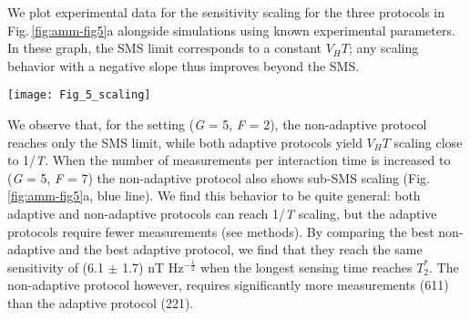 We plot experimental data for the sensitivity scaling for the three protocols in Fig.\,\ref{fig:amm-fig5}a alongside simulations using known experimental parameters. In these graph, the SMS limit corresponds to a constant $V_H T$; any scaling behavior with a negative slope thus improves beyond the SMS.

\begin{figure*}
	\centering
	\texttt{[image: Fig\_5\_scaling]}
	\caption{\label{fig:amm-fig5} \textbf{Scaling of sensitivity as a function of total time.} (a) The three protocols are compared by plotting $\eta^2 - V_H T$  as a function of the total sensing time \textit{T} (not including spin initialization and readout). For (\textit{G} = 5, \textit{F} = 2) the non-adaptive protocol (green triangles) is bound to the SMS limit, while for both the limited-adaptive (orange circles) and the optimized adaptive (red triangles) protocols $\eta^2$ scales close to 1/\textit{T}. The sensitivity of the limited-adaptive protocol is, however, worse than the optimized-adaptive one. When increasing the number of Ramsey experiments per sensing time to (\textit{G} = 5, \textit{F} = 7), the non-adaptive protocol (blue triangles) reaches Heisenberg-like scaling, with a sensitivity comparable to the optimized adaptive protocol for (\textit{G}=5, \textit{F}=2). (b) By including spin initialization and readout durations, the superiority of the optimized adaptive protocol (red triangles), which requires less Ramsey runs per sensing time (smaller \textit{F}, \textit{G}) to reach 1/\textit{T} scaling, is evidenced. The optimized adaptive protocol can estimate magnetic fields with a repetition rate of 20 Hz, with a sensitivity more than one order of magnitude better than the non-adaptive protocol. All data are taken with 700 repetitions per data-point. In both plots, error bars corresponding to one standard deviation of the results are obtained using the bootstrap method.}
\end{figure*}


We observe that, for the setting (\textit{G} = 5, \textit{F} = 2), the non-adaptive protocol reaches only the SMS limit, while both adaptive protocols yield $V_H T$ scaling close to 1/\textit{T}. When the number of measurements per interaction time is increased to (\textit{G} = 5, \textit{F} = 7) the non-adaptive protocol also shows sub-SMS scaling (Fig.\,\ref{fig:amm-fig5}a, blue line). We find this behavior to be quite general: both adaptive and non-adaptive protocols can reach 1/\textit{T} scaling, but the adaptive protocols require fewer measurements (see methods). By comparing the best non-adaptive and the best adaptive protocol, we find that they reach the same sensitivity of (6.1 $\pm$ 1.7) nT Hz$^{-\frac{1}{2}}$ when the longest sensing time reaches $T_2^*$. The non-adaptive protocol however, requires significantly more measurements (611) than the adaptive protocol (221).


